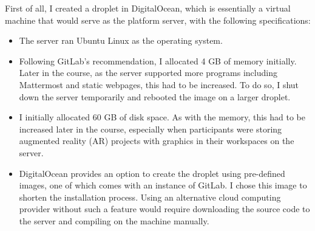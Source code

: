 \documentclass[12pt,twoside]{mitthesis}
\newcommand{\draft}[1]{{\color{blue} #1}}
\begin{document}
\draft{First of all, I created a droplet in DigitalOcean, which is essentially a virtual machine that would serve as the platform server, with the following specifications:
\begin{itemize}
	\item The server ran Ubuntu Linux as the operating system.
	\item Following GitLab's recommendation, I allocated 4 GB of memory initially. Later in the course, as the server supported more programs including Mattermost and static webpages, this had to be increased. To do so, I shut down the server temporarily and rebooted the image on a larger droplet.
	\item I initially allocated 60 GB of disk space. As with the memory, this had to be increased later in the course, especially when participants were storing augmented reality (AR) projects with graphics in their workspaces on the server.
	\item DigitalOcean provides an option to create the droplet using pre-defined images, one of which comes with an instance of GitLab. I chose this image to shorten the installation process. Using an alternative cloud computing provider without such a feature would require downloading the source code to the server and compiling on the machine manually.
\end{itemize}

}
\end{document}
